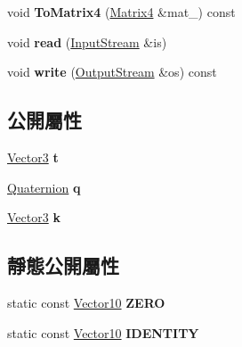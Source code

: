 \begin{DoxyCompactItemize}
\item 
void {\bfseries To\+Matrix4} (\hyperlink{class_i_dream_sky_1_1_matrix4}{Matrix4} \&mat\+\_\+) const \hypertarget{class_i_dream_sky_1_1_vector10_a937915ae7628ab201cd9e18504c31949}{}\label{class_i_dream_sky_1_1_vector10_a937915ae7628ab201cd9e18504c31949}

\item 
void {\bfseries read} (\hyperlink{class_i_dream_sky_1_1_input_stream}{Input\+Stream} \&is)\hypertarget{class_i_dream_sky_1_1_vector10_a9b27d0a53a31d97e43641f0868b48eac}{}\label{class_i_dream_sky_1_1_vector10_a9b27d0a53a31d97e43641f0868b48eac}

\item 
void {\bfseries write} (\hyperlink{class_i_dream_sky_1_1_output_stream}{Output\+Stream} \&os) const \hypertarget{class_i_dream_sky_1_1_vector10_ac0b8af4402c85cd9b1544ce98a75d032}{}\label{class_i_dream_sky_1_1_vector10_ac0b8af4402c85cd9b1544ce98a75d032}

\end{DoxyCompactItemize}
\subsection*{公開屬性}
\begin{DoxyCompactItemize}
\item 
\hyperlink{class_i_dream_sky_1_1_vector3}{Vector3} {\bfseries t}\hypertarget{class_i_dream_sky_1_1_vector10_a2cd8091e2dc4a28139f73cdac987c408}{}\label{class_i_dream_sky_1_1_vector10_a2cd8091e2dc4a28139f73cdac987c408}

\item 
\hyperlink{class_i_dream_sky_1_1_quaternion}{Quaternion} {\bfseries q}\hypertarget{class_i_dream_sky_1_1_vector10_ab55ed4857492c73bdedeb3836350abb9}{}\label{class_i_dream_sky_1_1_vector10_ab55ed4857492c73bdedeb3836350abb9}

\item 
\hyperlink{class_i_dream_sky_1_1_vector3}{Vector3} {\bfseries k}\hypertarget{class_i_dream_sky_1_1_vector10_ae1b1334c91610345e6457f656681eb26}{}\label{class_i_dream_sky_1_1_vector10_ae1b1334c91610345e6457f656681eb26}

\end{DoxyCompactItemize}
\subsection*{靜態公開屬性}
\begin{DoxyCompactItemize}
\item 
static const \hyperlink{class_i_dream_sky_1_1_vector10}{Vector10} {\bfseries Z\+E\+RO}\hypertarget{class_i_dream_sky_1_1_vector10_a56a8397508b66cc44365abf7ddea2771}{}\label{class_i_dream_sky_1_1_vector10_a56a8397508b66cc44365abf7ddea2771}

\item 
static const \hyperlink{class_i_dream_sky_1_1_vector10}{Vector10} {\bfseries I\+D\+E\+N\+T\+I\+TY}\hypertarget{class_i_dream_sky_1_1_vector10_aa885cacb37f240f8c59a45c5c7b8a9f2}{}\label{class_i_dream_sky_1_1_vector10_aa885cacb37f240f8c59a45c5c7b8a9f2}

\end{DoxyCompactItemize}


